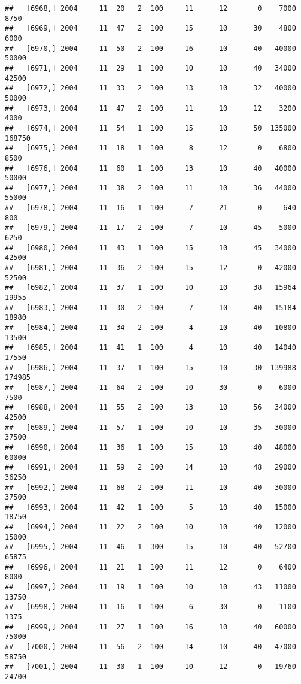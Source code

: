 \documentclass{article}\usepackage[]{graphicx}\usepackage[]{color}
\makeatletter
\newenvironment{kframe}{%
 \def\at@end@of@kframe{}%
 \ifinner\ifhmode%
  \def\at@end@of@kframe{\end{minipage}}%
  \begin{minipage}{\columnwidth}%
 \fi\fi%
 \def\FrameCommand##1{\hskip\@totalleftmargin \hskip-\fboxsep
 \colorbox{shadecolor}{##1}\hskip-\fboxsep
     \hskip-\linewidth \hskip-\@totalleftmargin \hskip\columnwidth}%
 \MakeFramed {\advance\hsize-\width
   \@totalleftmargin\z@ \linewidth\hsize
   \@setminipage}}%
 {\par\unskip\endMakeFramed%
 \at@end@of@kframe}
\newenvironment{knitrout}{}{} %
\makeatother
\begin{document}
\begin{knitrout}
\begin{kframe}
\begin{verbatim}
##   [6968,] 2004     11  20   2  100     11      12       0    7000    8750
##   [6969,] 2004     11  47   2  100     15      10      30    4800    6000
##   [6970,] 2004     11  50   2  100     16      10      40   40000   50000
##   [6971,] 2004     11  29   1  100     10      10      40   34000   42500
##   [6972,] 2004     11  33   2  100     13      10      32   40000   50000
##   [6973,] 2004     11  47   2  100     11      10      12    3200    4000
##   [6974,] 2004     11  54   1  100     15      10      50  135000  168750
##   [6975,] 2004     11  18   1  100      8      12       0    6800    8500
##   [6976,] 2004     11  60   1  100     13      10      40   40000   50000
##   [6977,] 2004     11  38   2  100     11      10      36   44000   55000
##   [6978,] 2004     11  16   1  100      7      21       0     640     800
##   [6979,] 2004     11  17   2  100      7      10      45    5000    6250
##   [6980,] 2004     11  43   1  100     15      10      45   34000   42500
##   [6981,] 2004     11  36   2  100     15      12       0   42000   52500
##   [6982,] 2004     11  37   1  100     10      10      38   15964   19955
##   [6983,] 2004     11  30   2  100      7      10      40   15184   18980
##   [6984,] 2004     11  34   2  100      4      10      40   10800   13500
##   [6985,] 2004     11  41   1  100      4      10      40   14040   17550
##   [6986,] 2004     11  37   1  100     15      10      30  139988  174985
##   [6987,] 2004     11  64   2  100     10      30       0    6000    7500
##   [6988,] 2004     11  55   2  100     13      10      56   34000   42500
##   [6989,] 2004     11  57   1  100     10      10      35   30000   37500
##   [6990,] 2004     11  36   1  100     15      10      40   48000   60000
##   [6991,] 2004     11  59   2  100     14      10      48   29000   36250
##   [6992,] 2004     11  68   2  100     11      10      40   30000   37500
##   [6993,] 2004     11  42   1  100      5      10      40   15000   18750
##   [6994,] 2004     11  22   2  100     10      10      40   12000   15000
##   [6995,] 2004     11  46   1  300     15      10      40   52700   65875
##   [6996,] 2004     11  21   1  100     11      12       0    6400    8000
##   [6997,] 2004     11  19   1  100     10      10      43   11000   13750
##   [6998,] 2004     11  16   1  100      6      30       0    1100    1375
##   [6999,] 2004     11  27   1  100     16      10      40   60000   75000
##   [7000,] 2004     11  56   2  100     14      10      40   47000   58750
##   [7001,] 2004     11  30   1  100     10      12       0   19760   24700

\end{verbatim}
\end{kframe}
\end{knitrout}
\end{document}
